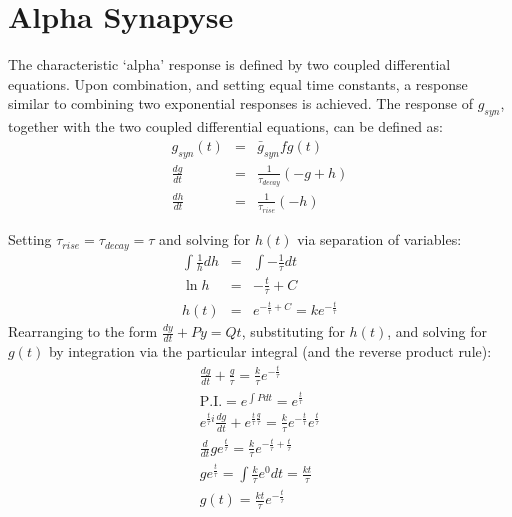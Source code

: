 \documentclass[12pt]{article}
\begin{document}
\section{Alpha Synapyse}
The characteristic `alpha' response is defined by two coupled differential equations. Upon combination, and setting equal time constants, a response similar to combining two exponential responses is achieved. The response of $g_{syn}$, together with the two coupled differential equations, can be defined as:
\begin{eqnarray}
g_{syn}(t) & = & \bar{g}_{syn}fg(t) \nonumber \\
\frac{dg}{dt} & = & \frac{1}{\tau_{decay}} (-g + h) \nonumber \\
\frac{dh}{dt} & = & \frac{1}{\tau_{rise}}(-h) \nonumber
\label{eqn:alpha_coupled_diff_eqns}
\end{eqnarray}

Setting $\tau_{rise}=\tau_{decay} = \tau$ and solving for $h(t)$ via separation of variables:
\begin{eqnarray}
\int \frac{1}{h} dh & = & \int -\frac{1}{\tau}dt \nonumber \\
\ln{h} & = & -\frac{t}{\tau} + C \nonumber \\
h(t) & = & e^{-\frac{t}{\tau}+C} = ke^{-\frac{t}{\tau}} \nonumber
\label{eqn:solve_for_h}
\end{eqnarray}
Rearranging to the form $\frac{dy}{dt} +Py = Qt$, substituting for $h(t)$, and solving for $g(t)$ by integration via the particular integral (and the reverse product rule):
\begin{eqnarray}
\frac{dg}{dt} + \frac{g}{\tau} =\frac{k}{\tau}e^{-\frac{t}{\tau}} \nonumber \\
\mathrm{P.I.} =  e^{\int P dt} = e^{\frac{t}{\tau}} \nonumber \\
e^{\frac{t}{\tau}i}\frac{dg}{dt} +  e^{\frac{t}{\tau}\frac{g}{\tau}} = \frac{k}{\tau}e^{-\frac{t}{\tau}}e^{\frac{t}{\tau}} \nonumber \\
\frac{d}{dt} g e^{\frac{t}{\tau}} = \frac{k}{\tau}e^{-\frac{t}{\tau} + \frac{t}{\tau}} \nonumber \\
g e^{\frac{t}{\tau}} = \int \frac{k}{\tau}e^0 dt = \frac{kt}{\tau} \nonumber \\
g(t) = \frac{kt}{\tau}e^{-\frac{t}{\tau}}
\end{eqnarray}
\end{document}

